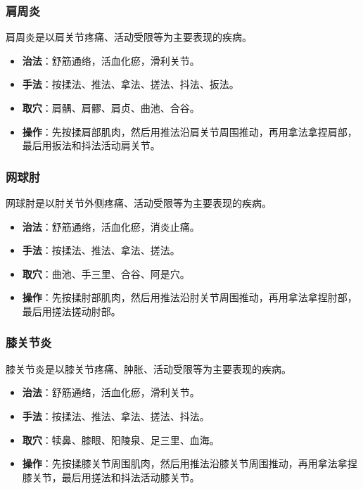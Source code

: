 \documentclass[12pt,UTF8]{ctexbook}
\begin{document}
\subsubsection{肩周炎}

肩周炎是以肩关节疼痛、活动受限等为主要表现的疾病。

\begin{itemize}
\item \textbf{治法}：舒筋通络，活血化瘀，滑利关节。
\item \textbf{手法}：按揉法、推法、拿法、搓法、抖法、扳法。
\item \textbf{取穴}：肩髃、肩髎、肩贞、曲池、合谷。
\item \textbf{操作}：先按揉肩部肌肉，然后用推法沿肩关节周围推动，再用拿法拿捏肩部，最后用扳法和抖法活动肩关节。
\end{itemize}

\subsubsection{网球肘}

网球肘是以肘关节外侧疼痛、活动受限等为主要表现的疾病。

\begin{itemize}
\item \textbf{治法}：舒筋通络，活血化瘀，消炎止痛。
\item \textbf{手法}：按揉法、推法、拿法、搓法。
\item \textbf{取穴}：曲池、手三里、合谷、阿是穴。
\item \textbf{操作}：先按揉肘部肌肉，然后用推法沿肘关节周围推动，再用拿法拿捏肘部，最后用搓法搓动肘部。
\end{itemize}

\subsubsection{膝关节炎}

膝关节炎是以膝关节疼痛、肿胀、活动受限等为主要表现的疾病。

\begin{itemize}
\item \textbf{治法}：舒筋通络，活血化瘀，滑利关节。
\item \textbf{手法}：按揉法、推法、拿法、搓法、抖法。
\item \textbf{取穴}：犊鼻、膝眼、阳陵泉、足三里、血海。
\item \textbf{操作}：先按揉膝关节周围肌肉，然后用推法沿膝关节周围推动，再用拿法拿捏膝关节，最后用搓法和抖法活动膝关节。
\end{itemize}
\end{document}
